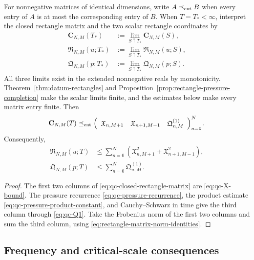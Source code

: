 \begin{proposition}
\label{prop:qc-closed-rectangle-matrix}
For nonnegative matrices of identical dimensions, write
\(A\preceq_{\rm ent}B\) when every entry of \(A\) is at most the
corresponding entry of \(B\).  When \(T=T_*<\infty\), interpret the closed
rectangle matrix and the two scalar rectangle coordinates by
\begin{align*}
 \mathbf C_{N,M}(T_*)&:=
 \lim_{S\uparrow T_*}\mathbf C_{N,M}(S),\\
 \mathfrak R_{N,M}(u;T_*)&:=
 \lim_{S\uparrow T_*}\mathfrak R_{N,M}(u;S),\\
 \mathfrak Q_{N,M}(p;T_*)&:=
 \lim_{S\uparrow T_*}\mathfrak Q_{N,M}(p;S).
\end{align*}
All three limits exist in the extended nonnegative reals by monotonicity.
Theorem~\ref{thm:datum-rectangles} and
Proposition~\ref{prop:rectangle-pressure-completion} make the scalar limits
finite, and the estimates below make every matrix entry finite.
Then
\begin{equation}
 \mathbf C_{N,M}(T)
 \preceq_{\rm ent}
 \left(
 \begin{array}{ccc}
  \mathfrak X_{n,M+1}
  &\mathfrak X_{n+1,M-1}
  &\mathfrak Q^{(1)}_{n,M}
 \end{array}
 \right)_{n=0}^{N}.
 \label{eq:qc-closed-rectangle-matrix}
\end{equation}
Consequently,
\begin{align}
 \mathfrak R_{N,M}(u;T)
 &\le\sum_{n=0}^{N}
 \left(\mathfrak X_{n,M+1}^2
       +\mathfrak X_{n+1,M-1}^2\right),
 \label{eq:qc-closed-rectangle-frobenius}\\
 \mathfrak Q_{N,M}(p;T)
 &\le\sum_{n=0}^{N}\mathfrak Q^{(1)}_{n,M}.
 \label{eq:qc-closed-pressure-column}
\end{align}
\end{proposition}

\begin{proof}
The first two columns of \eqref{eq:qc-closed-rectangle-matrix} are
\eqref{eq:qc-X-bound}.  The pressure recurrence
\eqref{eq:qc-pressure-recurrence}, the product estimate
\eqref{eq:qc-pressure-product-constant}, and Cauchy--Schwarz in time give
the third column through \eqref{eq:qc-Q1}.  Take the Frobenius norm of the
first two columns and sum the third column, using
\eqref{eq:rectangle-matrix-norm-identities}.
\end{proof}

\subsection{Frequency and critical-scale consequences}

